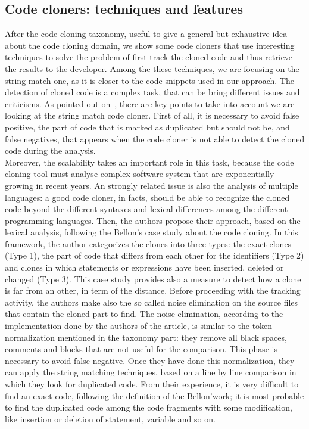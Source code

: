 \subsection{Code cloners: techniques and features}
After the code cloning taxonomy, useful to give a general but exhaustive idea about the code cloning domain, we show some code cloners that use interesting techniques to solve the problem of first track the cloned code and thus retrieve the results to the developer. Among the these techniques, we are focusing on the string match one, as it is closer to the code snippets used in our approach. The detection of cloned code is a complex task, that can be bring different issues and criticisms. As pointed out on~\cite{stephane_ducasse_effectiveness_2005}, there are key points to take into account we are looking at the string match code cloner. First of all, it is necessary to avoid false positive, the part of code that is marked as duplicated but should not be, and false negatives, that appears when the code cloner is not able to detect the cloned code during the analysis. \\
Moreover, the scalability takes an important role in this task, because the code cloning tool must analyse complex software system that are exponentially growing in recent years. An strongly related issue is also the analysis of multiple languages: a good code cloner, in facts, should be able to recognize the cloned code beyond the different syntaxes and lexical differences among the different programming languages. Then, the authors propose their approach, based on the lexical analysis, following the Bellon's case study about the code cloning. In this framework, the author categorizes the clones into three types: the exact clones (Type 1), the part of code that differs from each other for the identifiers (Type 2) and clones in which statements or expressions have been inserted, deleted or changed (Type 3). This case study provides also a measure to detect how a clone is far from an other, in term of the distance. Before proceeding with the tracking activity, the authors make also the so called noise elimination on the source files that contain the cloned part to find. The noise elimination, according to the implementation done by the authors of the article, is similar to the token normalization mentioned in the taxonomy part: they remove all black spaces, comments and blocks that are not useful for the comparison.
This phase is necessary to avoid false negative. Once they have done this normalization, they can apply the string matching techniques, based on a line by line comparison in which they look for duplicated code. From their experience, it is very difficult to find an exact code, following the definition of the Bellon'work; it is most probable to find the duplicated code among the code fragments with some modification, like insertion or deletion of statement, variable and so on. \\
